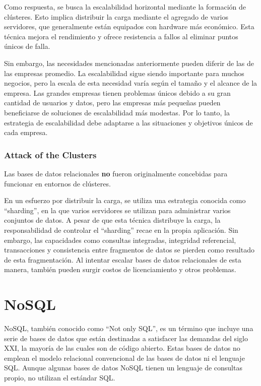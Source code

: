 \documentclass{article}
\begin{document}
		Como respuesta, se busca la escalabilidad horizontal mediante la formación de clústeres. Esto implica distribuir la carga mediante el agregado de varios servidores, que generalmente están equipados con hardware más económico. Esta técnica mejora el rendimiento y ofrece resistencia a fallos al eliminar puntos únicos de falla.
		
		Sin embargo, las necesidades mencionadas anteriormente pueden diferir de las de las empresas promedio. La escalabilidad sigue siendo importante para muchos negocios, pero la escala de esta necesidad varía según el tamaño y el alcance de la empresa. Las grandes empresas tienen problemas únicos debido a su gran cantidad de usuarios y datos, pero las empresas más pequeñas pueden beneficiarse de soluciones de escalabilidad más modestas. Por lo tanto, la estrategia de escalabilidad debe adaptarse a las situaciones y objetivos únicos de cada empresa.
		
		
		\subsubsection{Attack of the Clusters}
		Las bases de datos relacionales \textbf{no} fueron originalmente concebidas para funcionar en entornos de clústeres.
		
		En un esfuerzo por distribuir la carga, se utiliza una estrategia conocida como ``sharding'', en la que varios servidores se utilizan para administrar varios conjuntos de datos. A pesar de que esta técnica distribuye la carga, la responsabilidad de controlar el ``sharding'' recae en la propia aplicación. Sin embargo, las capacidades como consultas integradas, integridad referencial, transacciones y consistencia entre fragmentos de datos se pierden como resultado de esta fragmentación. Al intentar escalar bases de datos relacionales de esta manera, también pueden surgir costos de licenciamiento y otros problemas.								
		
		\section{NoSQL}
		NoSQL, también conocido como ``Not only SQL'', es un término que incluye una serie de bases de datos que están destinadas a satisfacer las demandas del siglo XXI, la mayoría de las cuales son de código abierto. Estas bases de datos no emplean el modelo relacional convencional de las bases de datos ni el lenguaje SQL. Aunque algunas bases de datos NoSQL tienen un lenguaje de consultas propio, no utilizan el estándar SQL.
		
\end{document}
